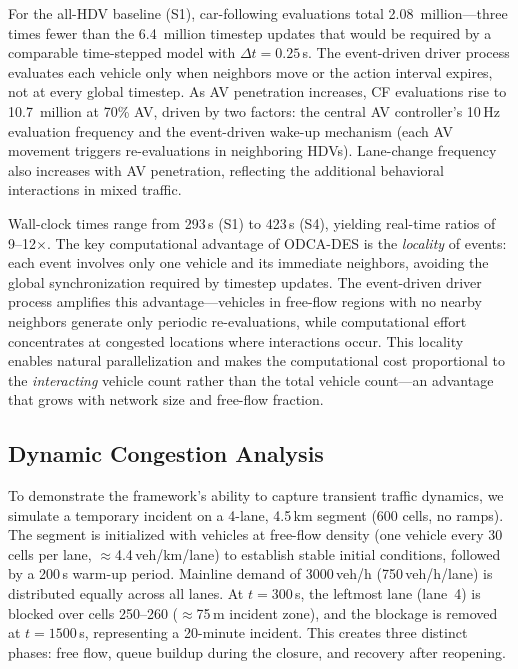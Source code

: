 \documentclass[review,authoryear]{elsarticle}
\begin{document}
For the all-HDV baseline (S1), car-following evaluations total 2.08~million---three times fewer than the 6.4~million timestep updates that would be required by a comparable time-stepped model with $\Delta t = 0.25$\,s. The event-driven driver process evaluates each vehicle only when neighbors move or the action interval expires, not at every global timestep. As AV penetration increases, CF evaluations rise to 10.7~million at 70\% AV, driven by two factors: the central AV controller's 10\,Hz evaluation frequency and the event-driven wake-up mechanism (each AV movement triggers re-evaluations in neighboring HDVs). Lane-change frequency also increases with AV penetration, reflecting the additional behavioral interactions in mixed traffic.

Wall-clock times range from 293\,s (S1) to 423\,s (S4), yielding real-time ratios of 9--12$\times$. The key computational advantage of ODCA-DES is the \emph{locality} of events: each event involves only one vehicle and its immediate neighbors, avoiding the global synchronization required by timestep updates. The event-driven driver process amplifies this advantage---vehicles in free-flow regions with no nearby neighbors generate only periodic re-evaluations, while computational effort concentrates at congested locations where interactions occur. This locality enables natural parallelization and makes the computational cost proportional to the \emph{interacting} vehicle count rather than the total vehicle count---an advantage that grows with network size and free-flow fraction.

\subsection{Dynamic Congestion Analysis}
\label{sec:exp_incident}

To demonstrate the framework's ability to capture transient traffic dynamics, we simulate a temporary incident on a 4-lane, 4.5\,km segment (600 cells, no ramps). The segment is initialized with vehicles at free-flow density (one vehicle every 30 cells per lane, $\approx$4.4\,veh/km/lane) to establish stable initial conditions, followed by a 200\,s warm-up period. Mainline demand of 3000\,veh/h (750\,veh/h/lane) is distributed equally across all lanes. At $t = 300$\,s, the leftmost lane (lane~4) is blocked over cells 250--260 ($\approx$75\,m incident zone), and the blockage is removed at $t = 1500$\,s, representing a 20-minute incident. This creates three distinct phases: free flow, queue buildup during the closure, and recovery after reopening.
\end{document}
